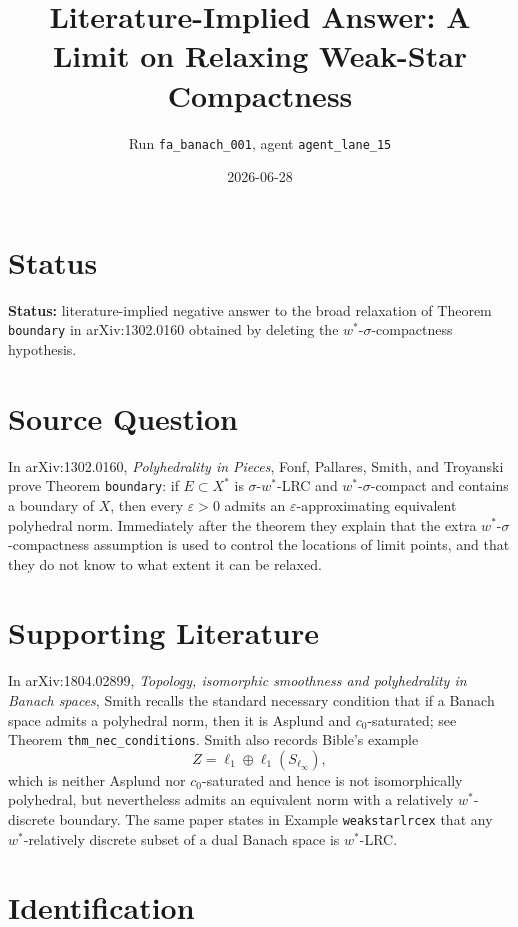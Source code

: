 \documentclass[11pt]{article}
\title{Literature-Implied Answer: A Limit on Relaxing Weak-Star Compactness}
\author{Run \texttt{fa\_banach\_001}, agent \texttt{agent\_lane\_15}}
\date{2026-06-28}
\begin{document}
\maketitle

\section*{Status}

\textbf{Status:} literature-implied negative answer to the broad relaxation
of Theorem \texttt{boundary} in arXiv:1302.0160 obtained by deleting the
$w^*$-$\sigma$-compactness hypothesis.

\section*{Source Question}

In arXiv:1302.0160, \emph{Polyhedrality in Pieces}, Fonf, Pallares,
Smith, and Troyanski prove Theorem \texttt{boundary}: if $E\subset X^*$ is
$\sigma$-$w^*$-LRC and $w^*$-$\sigma$-compact and contains a boundary of
$X$, then every $\varepsilon>0$ admits an $\varepsilon$-approximating
equivalent polyhedral norm.  Immediately after the theorem they explain that
the extra $w^*$-$\sigma$-compactness assumption is used to control the
locations of limit points, and that they do not know to what extent it can be
relaxed.

\section*{Supporting Literature}

In arXiv:1804.02899, \emph{Topology, isomorphic smoothness and
polyhedrality in Banach spaces}, Smith recalls the standard necessary
condition that if a Banach space admits a polyhedral norm, then it is Asplund
and $c_0$-saturated; see Theorem \texttt{thm\_nec\_conditions}.  Smith also
records Bible's example
\[
   Z=\ell_1\oplus \ell_1(S_{\ell_\infty}),
\]
which is neither Asplund nor $c_0$-saturated and hence is not
isomorphically polyhedral, but nevertheless admits an equivalent norm with a
relatively $w^*$-discrete boundary.  The same paper states in Example
\texttt{weakstarlrcex} that any $w^*$-relatively discrete subset of a dual
Banach space is $w^*$-LRC.

\section*{Identification}
\end{document}
